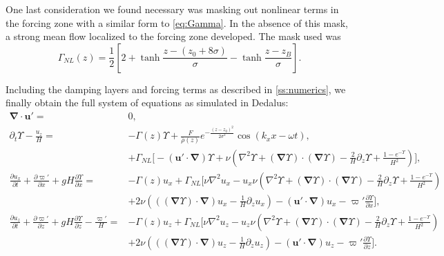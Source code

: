 \documentclass[
        fleqn,
        usenatbib,
    ]{mnras}
\newcommand*{\pd}[2]{\frac{\partial#1}{\partial#2}}
\newcommand*{\p}[1]{\left(#1\right)}
\newcommand*{\s}[1]{\left[#1\right]}
\newcommand*{\bm}[1]{\boldsymbol{\mathbf{#1}}}
\begin{document}
One last consideration we found necessary was masking out nonlinear terms in the
forcing zone with a similar form to \autoref{eq:Gamma}. In the absence of this
mask, a strong mean flow localized to the forcing zone developed. The mask used
was
\begin{equation}
    \Gamma_{NL}(z) = \frac{1}{2}\s{2
        + \tanh \frac{z - (z_0 + 8\sigma)}{\sigma}
        - \tanh \frac{z - z_B}{\sigma}}.
\end{equation}

Including the damping layers and forcing terms as described in
\autoref{ss:numerics}, we finally obtain the full system of equations as
simulated in Dedalus:
\begin{subequations}
    \begin{align}
        \bm{\nabla} \cdot \bm{u}' ={}& 0,\\
        \partial_t \Upsilon - \frac{u_z}{H}
            ={}& -\Gamma(z) \Upsilon
                + \frac{F}{\overline{\rho}(z)}e^{-\frac{(z - z_0)^2}{2\sigma^2}}
                    \cos \p{k_xx - \omega t},\nonumber\\
            & + \Gamma_{NL} \bigg[-\p{\bm{u}' \cdot \bm{\nabla}}\Upsilon
                + \nu\p{\nabla^2 \Upsilon + \p{
                    \bm{\nabla} \Upsilon} \cdot \p{\bm{\nabla}\Upsilon}
                    - \frac{2}{H}\partial_z \Upsilon
                    + \frac{1 - e^{-\Upsilon}}{H^2}}\bigg],\\
        \pd{u_x}{t} + \pd{\varpi'}{x} + gH\pd{\Upsilon}{x} ={}&
            -\Gamma(z) u_x
            + \Gamma_{NL}\bigg[\nu \nabla^2 u_x
            - u_x \nu\p{\nabla^2 \Upsilon + \p{\bm{\nabla} \Upsilon} \cdot
                \p{\bm{\nabla}\Upsilon} - \frac{2}{H}\partial_z \Upsilon
                + \frac{1 - e^{-\Upsilon}}{H^2}}\nonumber\\
            &+ 2\nu \p{\p{\p{\bm{\nabla}\Upsilon} \cdot \bm{\nabla}}u_x
                - \frac{1}{H}\partial_z u_x}
                - \p{\bm{u}' \cdot \bm{\nabla}}u_x
                - \varpi' \pd{\Upsilon}{x}\bigg],\\
        \pd{u_z}{t} + \pd{\varpi'}{z} + gH\pd{\Upsilon}{z} - \frac{\varpi'}{H}
            ={}& -\Gamma(z) u_z
            +\Gamma_{NL}\bigg[\nu \nabla^2 u_z
            - u_z \nu\p{\nabla^2 \Upsilon + \p{\bm{\nabla} \Upsilon} \cdot
                \p{\bm{\nabla}\Upsilon} - \frac{2}{H}\partial_z \Upsilon
                + \frac{1 - e^{-\Upsilon}}{H^2}}\nonumber\\
            &+ 2\nu \p{\p{\p{\bm{\nabla}\Upsilon} \cdot \bm{\nabla}}u_z -
                \frac{1}{H}\partial_z u_{z}}
            - \p{\bm{u}' \cdot \bm{\nabla}}u_z
            - \varpi' \pd{\Upsilon}{z}\bigg].
    \end{align}
\end{subequations}
\label{lastpage} %
\end{document}
